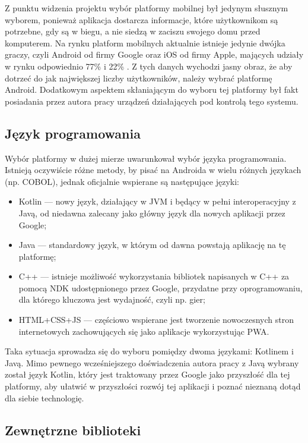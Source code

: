\documentclass[polish,polish,a4paper,12pt]{article}
\begin{document}
	Z punktu widzenia projektu wybór platformy mobilnej był jedynym słusznym wyborem, ponieważ aplikacja dostarcza informacje, które użytkownikom są potrzebne, gdy są w biegu, a nie siedzą w zaciszu swojego domu przed komputerem. Na rynku platform mobilnych aktualnie istnieje jedynie dwójka graczy, czyli Android od firmy Google oraz iOS od firmy Apple, mających udziały w rynku odpowiednio 77\% i 22\% \cite{mobilemarketshare}. Z tych danych wychodzi jasny obraz, że aby dotrzeć do jak największej liczby użytkowników, należy wybrać platformę Android. Dodatkowym aspektem skłaniającym do wyboru tej platformy był fakt posiadania przez autora pracy urządzeń działających pod kontrolą tego systemu.

	\subsection{Język programowania}

	Wybór platformy w dużej mierze uwarunkował wybór języka programowania. Istnieją oczywiście różne metody, by pisać na Androida w wielu różnych językach (np. COBOL), jednak oficjalnie wspierane są następujące języki:

	\begin{itemize}
		\item Kotlin — nowy język, działający w JVM i będący w pełni interoperacyjny z Javą, od niedawna zalecany jako główny język dla nowych aplikacji przez Google;
		\item Java — standardowy język, w którym od dawna powstają aplikację na tę platformę;
		\item C++ — istnieje możliwość wykorzystania bibliotek napisanych w C++ za pomocą NDK udostępnionego przez Google, przydatne przy oprogramowaniu, dla którego kluczowa jest wydajność, czyli np. gier;
		\item HTML+CSS+JS — częściowo wspierane jest tworzenie nowoczesnych stron internetowych zachowujących się jako aplikacje wykorzystując PWA.
	\end{itemize}

	Taka sytuacja sprowadza się do wyboru pomiędzy dwoma językami: Kotlinem i Javą. Mimo pewnego wcześniejszego doświadczenia autora pracy z Javą wybrany został język Kotlin, który jest traktowany przez Google jako przyszłość dla tej platformy, aby ułatwić w przyszłości rozwój tej aplikacji i poznać nieznaną dotąd dla siebie technologię.

	\subsection{Zewnętrzne biblioteki}
\end{document}
